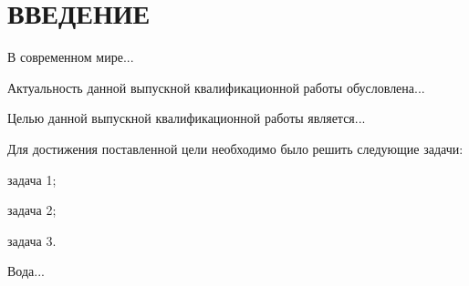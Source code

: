 \chapter*{\centering ВВЕДЕНИЕ}

В современном мире...

Актуальность данной выпускной квалификационной работы обусловлена...

Целью данной выпускной квалификационной работы является...

Для достижения поставленной цели необходимо было решить следующие задачи:
\begin{diplomaitemize}
    \item задача 1;
    \item задача 2;
    \item задача 3.
\end{diplomaitemize}

Вода...